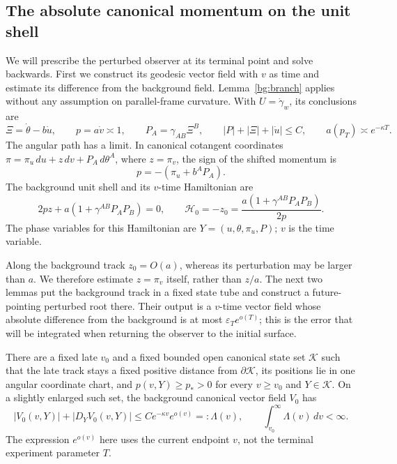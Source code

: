 \subsection{The absolute canonical momentum on the unit shell}

We will prescribe the perturbed observer at its terminal point and solve
backwards. First we construct its geodesic vector field with $v$ as
time and estimate its difference from the background field.
Lemma~\ref{bg:branch} applies without any
assumption on parallel-frame curvature. With $U=\dot\gamma_w$, its conclusions are
\begin{equation}\label{attach:branch-variables}
 \Xi=\dot\theta-b\dot u,\qquad p=a\dot v\asymp1,
 \qquad P_A=\gamma_{AB}\Xi^B,
 \qquad |P|+|\Xi|+|\dot u|\le C,
 \qquad a(p_T)\asymp e^{-\kappa T}.
\end{equation}
The angular path has a limit. In canonical cotangent coordinates
$\pi=\pi_u\,du+z\,dv+P_A\,d\theta^A$, where $z=\pi_v$, the sign
of the shifted momentum is
\begin{equation}\label{attach:shifted-momentum}
 p=-(\pi_u+b^AP_A).
\end{equation}
The background unit shell and its $v$-time Hamiltonian are
\begin{equation}\label{attach:background-shell}
 2pz+a(1+\gamma^{AB}P_AP_B)=0,
 \qquad \mathcal H_0=-z_0
   =\frac{a(1+\gamma^{AB}P_AP_B)}{2p}.
\end{equation}
The phase variables for this Hamiltonian are
$Y=(u,\theta,\pi_u,P)$; $v$ is the time variable.

Along the background track $z_0=O(a)$, whereas its perturbation may be larger
than $a$. We therefore estimate $z=\pi_v$ itself, rather than $z/a$.
The next two lemmas put the background track in a fixed state tube and
construct a future-pointing perturbed root there. Their output is a
$v$-time vector field whose absolute difference from the background is
at most $\varepsilon_T e^{o(T)}$; this is the error that will be
integrated when returning the observer to the initial surface.

\begin{lemma}\label{attach:canonical-tube}
There are a fixed late $v_0$ and a fixed bounded open canonical
state set $\mathcal K$ such that the late track stays a fixed
positive distance from $\partial\mathcal K$, its positions lie
in one angular coordinate chart, and $p(v,Y)\ge p_*>0$ for every
$v\ge v_0$ and $Y\in\mathcal K$. On a slightly enlarged such set,
the background canonical vector field $V_0$ has
\begin{equation}\label{attach:integrable-rate}
 |V_0(v,Y)|+|D_YV_0(v,Y)|
 \le C e^{-\kappa v}e^{o(v)}=:\Lambda(v),
 \qquad \int_{v_0}^{\infty}\Lambda(v)\,dv<\infty.
\end{equation}
The expression $e^{o(v)}$ here uses the current endpoint $v$, not
the terminal experiment parameter $T$.
\end{lemma}

